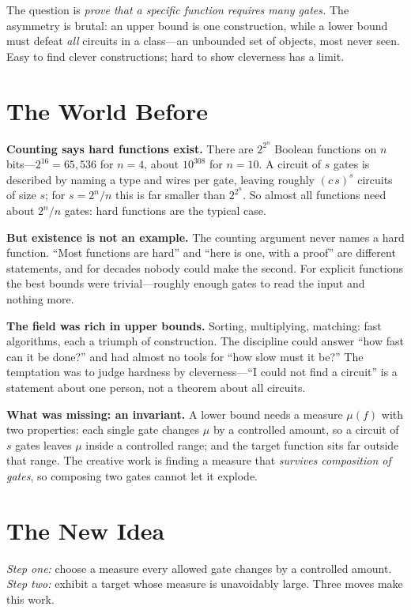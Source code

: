 The question is \emph{prove that a specific function requires many gates.} The asymmetry is brutal: an upper bound is one construction, while a lower bound must defeat \emph{all} circuits in a class---an unbounded set of objects, most never seen. Easy to find clever constructions; hard to show cleverness has a limit.

\section{The World Before}

\noindent\textbf{Counting says hard functions exist.} There are $2^{2^n}$ Boolean functions on $n$ bits---$2^{16}=65{,}536$ for $n=4$, about $10^{308}$ for $n=10$. A circuit of $s$ gates is described by naming a type and wires per gate, leaving roughly $(c\,s)^s$ circuits of size $s$; for $s=2^n/n$ this is far smaller than $2^{2^n}$. So almost all functions need about $2^n/n$ gates: hard functions are the typical case.

\noindent\textbf{But existence is not an example.} The counting argument never names a hard function. ``Most functions are hard'' and ``here is one, with a proof'' are different statements, and for decades nobody could make the second. For explicit functions the best bounds were trivial---roughly enough gates to read the input and nothing more.

\noindent\textbf{The field was rich in upper bounds.} Sorting, multiplying, matching: fast algorithms, each a triumph of construction. The discipline could answer ``how fast can it be done?'' and had almost no tools for ``how slow must it be?'' The temptation was to judge hardness by cleverness---``I could not find a circuit'' is a statement about one person, not a theorem about all circuits.

\noindent\textbf{What was missing: an invariant.} A lower bound needs a measure $\mu(f)$ with two properties: each single gate changes $\mu$ by a controlled amount, so a circuit of $s$ gates leaves $\mu$ inside a controlled range; and the target function sits far outside that range. The creative work is finding a measure that \emph{survives composition of gates}, so composing two gates cannot let it explode.

\section{The New Idea}
\emph{Step one:} choose a measure every allowed gate changes by a controlled amount. \emph{Step two:} exhibit a target whose measure is unavoidably large. Three moves make this work.

